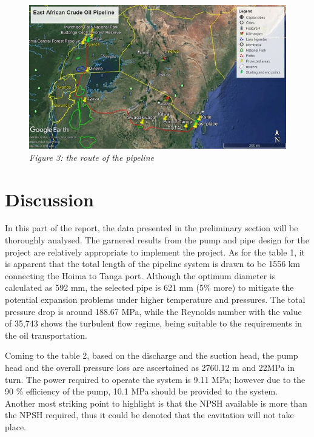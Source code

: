 \documentclass[12pt]{article}
\begin{document}
{ \begin{figure}[H]
  \centering
  \includegraphics[width=1\textwidth]{assets/images/route.jpg}
  \textit{Figure 3: the route of the pipeline}
  
 \end{figure}
}
      \section{Discussion}

      \hspace*{1em}In this part of the report, the data presented in the preliminary section will be thoroughly analysed. The garnered results from the pump and pipe design for the project are relatively appropriate to implement the project. As for the table 1, it is apparent that the total length of the pipeline system is drawn to be 1556 km connecting the Hoima to Tanga port. Although the optimum diameter is calculated as 592 mm, the selected pipe is 621 mm (5\% more) to mitigate the potential expansion problems under higher temperature and pressures. The total pressure drop is around 188.67 MPa, while the Reynolds number with the value of 35,743 shows the turbulent flow regime, being suitable to the requirements in the oil transportation. 

      \hspace*{1em}Coming to the table 2, based on the discharge and the suction head, the pump head and the overall pressure loss are ascertained as 2760.12 m and 22MPa in turn. The power required to operate the system is 9.11 MPa; however due to the 90 \% efficiency of the pump, 10.1 MPa should be provided to the system. Another most striking point to highlight is that the NPSH available is more than the NPSH required, thus it could be denoted that the cavitation will not take place.\\
\end{document}
